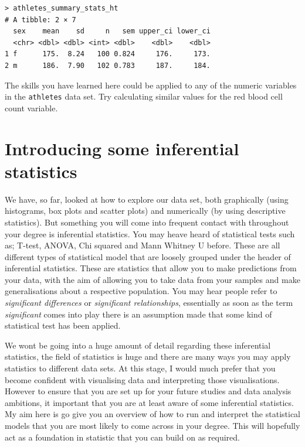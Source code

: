 \documentclass[
]{book}
\begin{document}
\begin{verbatim}
> athletes_summary_stats_ht
# A tibble: 2 × 7
  sex    mean    sd     n   sem upper_ci lower_ci
  <chr> <dbl> <dbl> <int> <dbl>    <dbl>    <dbl>
1 f      175.  8.24   100 0.824     176.     173.
2 m      186.  7.90   102 0.783     187.     184.
\end{verbatim}

The skills you have learned here could be applied to any of the numeric variables in the \texttt{athletes} data set. Try calculating similar values for the red blood cell count variable.

\section{Introducing some inferential statistics}\label{introducing-some-inferential-statistics}

We have, so far, looked at how to explore our data set, both graphically (using histograms, box plots and scatter plots) and numerically (by using descriptive statistics). But something you will come into frequent contact with throughout your degree is inferential statistics. You may heave heard of statistical tests such as; T-test, ANOVA, Chi squared and Mann Whitney U before. These are all different types of statistical model that are loosely grouped under the header of inferential statistics. These are statistics that allow you to make predictions from your data, with the aim of allowing you to take data from your samples and make generalisations about a respective population. You may hear people refer to \emph{significant differences} or \emph{significant relationships}, essentially as soon as the term \emph{significant} comes into play there is an assumption made that some kind of statistical test has been applied.

We wont be going into a huge amount of detail regarding these inferential statistics, the field of statistics is huge and there are many ways you may apply statistics to different data sets. At this stage, I would much prefer that you become confident with visualising data and interpreting those visualisations. However to ensure that you are set up for your future studies and data analysis ambitions, it important that you are at least aware of some inferential statistics. My aim here is go give you an overview of how to run and interpret the statistical models that you are most likely to come across in your degree. This will hopefully act as a foundation in statistic that you can build on as required.
\end{document}
